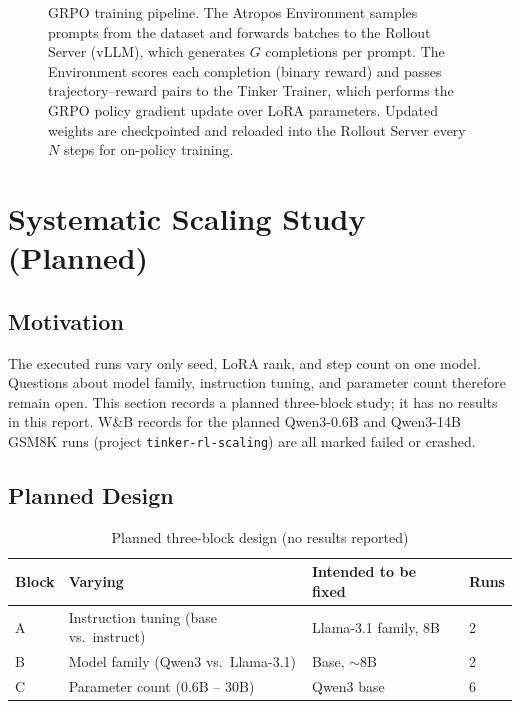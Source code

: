 \documentclass[12pt,a4paper]{report}
\theoremstyle{definition}
\begin{document}
\begin{figure}[htbp]
\begin{tikzpicture}
\end{tikzpicture}
\caption{GRPO training pipeline. The Atropos Environment samples prompts from the dataset and forwards batches to the Rollout Server (vLLM), which generates $G$ completions per prompt. The Environment scores each completion (binary reward) and passes trajectory--reward pairs to the Tinker Trainer, which performs the GRPO policy gradient update over LoRA parameters. Updated weights are checkpointed and reloaded into the Rollout Server every $N$ steps for on-policy training.}
\label{fig:grpo_pipeline}
\end{figure}

\section{Systematic Scaling Study (Planned)}
\label{sec:systematic_study}

\subsection{Motivation}
The executed runs vary only seed, LoRA rank, and step count on one model. Questions about model family, instruction tuning, and parameter count therefore remain open. This section records a planned three-block study; it has no results in this report. W\&B records for the planned Qwen3-0.6B and Qwen3-14B GSM8K runs (project \texttt{tinker-rl-scaling}) are all marked failed or crashed.

\subsection{Planned Design}

\begin{table}[htbp]
\centering
\caption{Planned three-block design (no results reported)}
\label{tab:systematic_design}
\begin{tabular}{llll}
\toprule
\textbf{Block} & \textbf{Varying} & \textbf{Intended to be fixed} & \textbf{Runs} \\
\midrule
A & Instruction tuning (base vs.\ instruct) & Llama-3.1 family, 8B & 2 \\
B & Model family (Qwen3 vs.\ Llama-3.1) & Base, $\sim$8B & 2 \\
C & Parameter count (0.6B -- 30B) & Qwen3 base & 6 \\
\bottomrule
\end{tabular}
\end{table}
\end{document}
